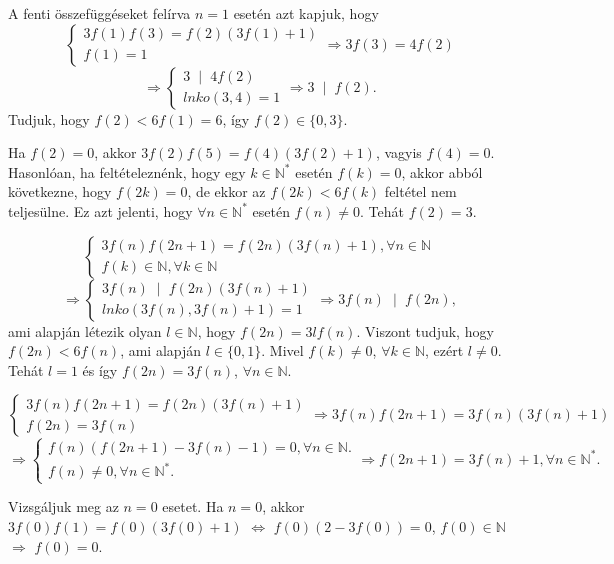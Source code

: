 \begin{solution}
	A fenti összefüggéseket felírva $n=1$ esetén azt kapjuk, hogy 
	\[
	\left\{ \begin{array}{l}
		3f(1)f(3)=f(2)(3f(1)+1)\\
		f(1)=1
	\end{array}\right.\Rightarrow3f(3)=4f(2)
	\]
	\[
	\Rightarrow\left\{ \begin{array}{l}
		3\phantom{x}|\phantom{x}4f(2)\\
		lnko(3,4)=1
	\end{array}\right.\Rightarrow3\phantom{x}|\phantom{x}f(2).
	\]
	Tudjuk, hogy $f(2)<6f(1)=6$, így $f(2)\in\{0,3\}$.
	
	Ha $f(2)=0$, akkor $3f(2)f(5)=f(4)(3f(2)+1)$, vagyis $f(4)=0$.
	Hasonlóan, ha feltételeznénk, hogy egy $k\in\mathbb{N}^{*}$ esetén
	$f(k)=0$, akkor abból következne, hogy $f(2k)=0$, de ekkor az $f(2k)<6f(k)$
	feltétel nem teljesülne. Ez azt jelenti, hogy $\forall n\in\mathbb{N}^{*}$
	esetén $f(n)\neq0$. Tehát $f(2)=3$.
	
	\[
	\left\{ \begin{array}{l}
		3f(n)f(2n+1)=f(2n)(3f(n)+1),\forall n\in\mathbb{N}\\
		f(k)\in\mathbb{N},\forall k\in\mathbb{N}
	\end{array}\right.
	\]
	\[
	\Rightarrow\left\{ \begin{array}{l}
		3f(n)\phantom{x}|\phantom{x}f(2n)(3f(n)+1)\\
		lnko(3f(n),3f(n)+1)=1
	\end{array}\right.\Rightarrow3f(n)\phantom{x}|\phantom{x}f(2n),
	\]
	ami alapján létezik olyan $l\in\mathbb{N}$, hogy $f(2n)=3lf(n)$.
	Viszont tudjuk, hogy $f(2n)<6f(n)$, ami alapján $l\in\{0,1\}$. Mivel
	$f(k)\neq0$, $\forall k\in\mathbb{N}$, ezért $l\neq0$. Tehát $l=1$
	és így $f(2n)=3f(n)$, $\forall n\in\mathbb{N}$.
	
	\[
	\left\{ \begin{array}{l}
		3f(n)f(2n+1)=f(2n)(3f(n)+1)\\
		f(2n)=3f(n)
	\end{array}\right.\Rightarrow3f(n)f(2n+1)=3f(n)(3f(n)+1)
	\]
	\[
	\Rightarrow\left\{ \begin{array}{l}
		f(n)(f(2n+1)-3f(n)-1)=0,\forall n\in\mathbb{N}.\\
		f(n)\neq0,\forall n\in\mathbb{N}^{*}.
	\end{array}\right.\Rightarrow f(2n+1)=3f(n)+1,\forall n\in\mathbb{N}^{*}.
	\]
	
	Vizsgáljuk meg az $n=0$ esetet. Ha $n=0$, akkor $3f(0)f(1)=f(0)(3f(0)+1)$
	$\Leftrightarrow$ $f(0)(2-3f(0))=0$, $f(0)\in\mathbb{N}$ $\Rightarrow$
	$f(0)=0$.
	

\end{solution}

